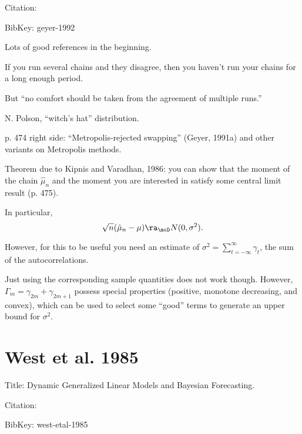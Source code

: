 \documentclass{article}
\begin{document}
Citation: \cite{geyer-1992}

BibKey: geyer-1992

\begin{outline}

\1 Lots of good references in the beginning.

\1 If you run several chains and they disagree, then you haven't run your chains
for a long enough period.

  \2 But ``no comfort should be taken from the agreement of multiple runs.''

  \2 N. Polson, ``witch's hat'' distribution.

\1 p. 474 right side: ``Metropolis-rejected swapping'' (Geyer, 1991a) and other variants on
Metropolis methods.

\1 Theorem due to Kipnis and Varadhan, 1986: you can show that the moment of the
chain $\hat \mu_n$ and the moment you are interested in satisfy some central
limit result (p. 475).

In particular,
\[
\sqrt{n} (\hat \mu_n - \mu) \ra_{\mcD} N(0, \sigma^2).
\]

However, for this to be useful you need an estimate of $\sigma^2 =
\sum_{t=-\infty}^\infty \gamma_t$, the sum of the autocorrelations.

Just using the corresponding sample quantities does not work though.  However,
$\Gamma_m = \gamma_{2m} + \gamma_{2m+1}$ possess special properties (positive,
monotone decreasing, and convex), which can be used to select some ``good''
terms to generate an upper bound for $\sigma^2$.

\end{outline}

\section{West et al. 1985}

Title: Dynamic Generalized Linear Models and Bayesian Forecasting.

Citation: \cite{west-etal-1985}

BibKey: west-etal-1985
\end{document}
